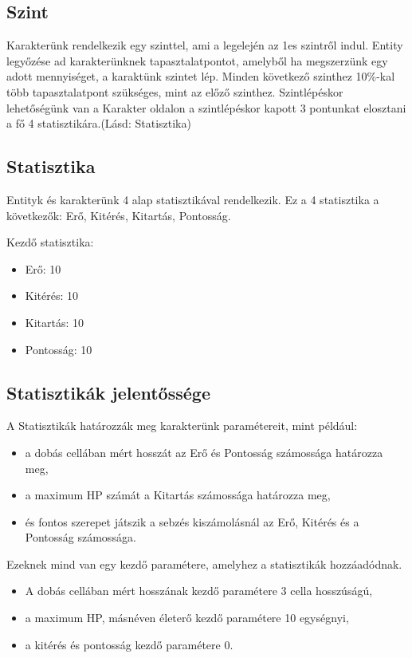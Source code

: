 \subsection{Szint}

Karakterünk rendelkezik egy szinttel, ami a legelején az 1es szintről indul.
Entity legyőzése ad karakterünknek tapasztalatpontot, amelyből ha megszerzünk egy adott mennyiséget, a karaktünk szintet lép.
Minden következő szinthez 10\%-kal több tapasztalatpont szükséges, mint az előző szinthez.
Szintlépéskor lehetőségünk van a Karakter oldalon a szintlépéskor kapott 3 pontunkat elosztani a fő 4 statisztikára.(Lásd: Statisztika)

\subsection{Statisztika}

Entityk és karakterünk 4 alap statisztikával rendelkezik.
Ez a 4 statisztika a következők: Erő, Kitérés, Kitartás, Pontosság.

\noindent Kezdő statisztika:
\begin{itemize}
    \item Erő: 10
    \item Kitérés: 10
    \item Kitartás: 10
    \item Pontosság: 10
\end{itemize}

\subsection{Statisztikák jelentőssége}

A Statisztikák határozzák meg karakterünk paramétereit, mint például:
\begin{itemize}
    \item a dobás cellában mért hosszát az Erő és Pontosság számossága határozza meg,
    \item a maximum HP számát a Kitartás számossága határozza meg,
    \item és fontos szerepet játszik a sebzés kiszámolásnál az Erő, Kitérés és a Pontosság számossága.
\end{itemize}

\noindent Ezeknek mind van egy kezdő paramétere, amelyhez a statisztikák hozzáadódnak.

\begin{itemize}
    \item A dobás cellában mért hosszának kezdő paramétere 3 cella hosszúságú,
    \item a maximum HP, másnéven életerő kezdő paramétere 10 egységnyi,
    \item a kitérés és pontosság kezdő paramétere 0.
\end{itemize}

